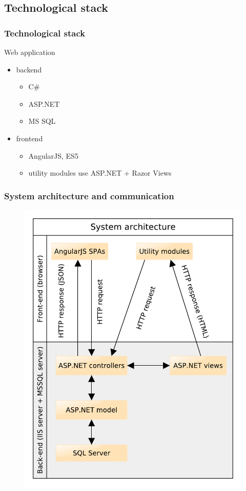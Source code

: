 \documentclass{beamer}
\begin{document}
\subsection{Technological stack}
\begin{frame}
\frametitle{Technological stack}
Web application
\begin{itemize}
	\item backend 
	\begin{itemize}
		\item C\#
		\item ASP.NET
		\item MS SQL 
	\end{itemize}
	\item frontend 
	\begin{itemize}
		\item AngularJS, ES5 
		\item utility modules use ASP.NET + Razor Views
	\end{itemize}
\end{itemize}
\end{frame}

\begin{frame}
\frametitle{System architecture and communication}
\begin{figure}
	\centering
	\includegraphics[width=0.6\linewidth]{../architecture}
	\label{fig:rendered-report}
\end{figure}
\end{frame}
\end{document}
